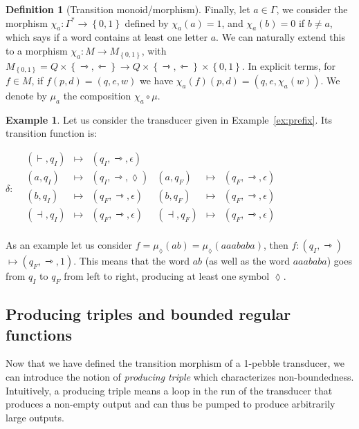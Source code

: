 \documentclass[sigplan,review,anonymous]{acmart}\settopmatter{printfolios=true,printccs=false,printacmref=false}
\newcommand{\set}[1]{\left\{#1 \right\}}
\newcommand{\mleft}{\leftarrowtriangle}
\newcommand{\mright}{\rightarrowtriangle}
\theoremstyle{definition}
\newtheorem{definition}[theorem]{Definition}
\newtheorem{example}[theorem]{Example}
\theoremstyle{remark}
\begin{document}
\begin{definition}[Transition monoid/morphism]
\begin{comment}
We define the morphism $\mu_{\mathbf{1}}:(\Sigma_{\vdash\dashv})^*\to M_{\mathbf 1}$ as follows. For every $d\in\set{\mright,\mleft}$,
$$\text{if } \delta(a,q)=(q',d',w) \text{ then }  \mu(a)(q,d)=(q',d') $$

\end{comment}


Finally, let $a\in  \Gamma$, we consider the morphism $\chi_a:\Gamma^*\rightarrow \set{0,1}$ defined by $\chi_a(a)=1$, and $\chi_a(b)=0$ if $b\neq a$, which says if a word contains at least one letter $a$.
We can naturally extend this to a morphism $\chi_a:M\rightarrow M_{\set{0,1}}$, with $M_{\set{0,1}}= Q\times\set{\mright,\mleft}\to Q\times\set{\mright,\mleft}\times \set{0,1}$.
In explicit terms, for $f\in M$, if $f(p,d)=(q,e,w)$ we have $\chi_a(f)(p,d)= (q,e,\chi_a(w))$.
We denote by $\mu_a$ the composition $\chi_a\circ \mu$.
\end{definition} 

\begin{example}
  \label{ex:transition}
    Let us consider the transducer given in Example~\ref{ex:prefix}.
    Its transition function is:

    $\delta: \begin{array}{crclrcl}
        &(\vdash,q_I) &\mapsto& (q_I,\mright,\epsilon) \\
        &(a,q_I)& \mapsto& (q_I,\mright,\lozenge) & (a,q_F)& \mapsto& (q_F,\mright,\epsilon)\\
        &(b,q_I)& \mapsto& (q_F,\mright,\epsilon) & (b,q_F)& \mapsto & (q_F,\mright,\epsilon)\\
        &(\dashv,q_I)& \mapsto& (q_F,\mright,\epsilon) & (\dashv,q_F)& \mapsto & (q_F,\mright,\epsilon)\\
    \end{array}$

\noindent As an example let us consider $f=\mu_{\lozenge}(ab)=\mu_{\lozenge}(aaababa)$, then $f: (q_I,\mright)$ $\mapsto (q_F,\mright,1)$. This means that the word $ab$ (as well as the word $aaababa$) goes from $q_I$ to $q_F$ from left to right, producing at least one symbol ${\lozenge}$.
\end{example}


\subsection{Producing triples and bounded regular functions}
Now that we have defined the transition morphism of a 1-pebble transducer, we can introduce the notion of \emph{producing triple} which characterizes non-boundedness. Intuitively, a producing triple means a loop in the run of the transducer that produces a non-empty output and can thus be pumped to produce arbitrarily large outputs.
\end{document}
